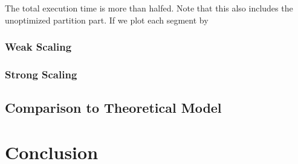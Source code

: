 \documentclass[]{article}
\begin{document}
The total execution time is more than halfed. Note that this also includes the unoptimized partition part. If we plot each segment by 

\begin{figure}
\end{figure}


\subsubsection{Weak Scaling}

\subsubsection{Strong Scaling}

\subsection{Comparison to Theoretical Model}

\newpage
\section{Conclusion}





\listoffigures
\listoftables
\end{document}
